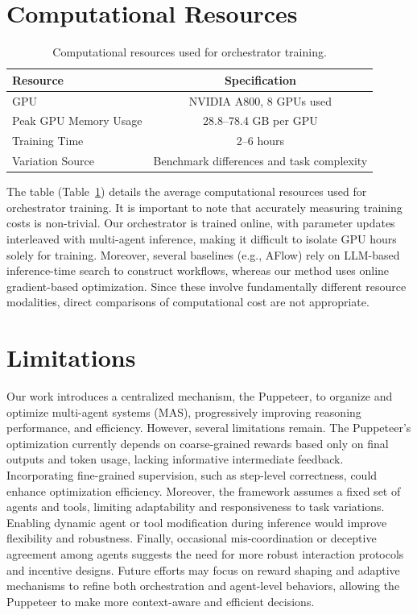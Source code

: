 \documentclass{article}
\begin{document}
\section{Computational Resources}
\begin{table}[h]
\centering
\begin{tabular}{l c }
\toprule
\textbf{Resource} & \textbf{Specification}  \\
\midrule
GPU & NVIDIA A800, 8 GPUs used \\
Peak GPU Memory Usage & 28.8--78.4 GB per GPU  \\
Training Time & 2--6 hours  \\
Variation Source & Benchmark differences and task complexity  \\
\bottomrule
\end{tabular}
\caption{Computational resources used for orchestrator training.}
\label{tab:compute}
\end{table}
The table (Table~\ref{tab:compute}) details the average computational resources used for orchestrator training. 
It is important to note that accurately measuring training costs is non-trivial. Our orchestrator is trained online, with parameter updates interleaved with multi-agent inference, making it difficult to isolate GPU hours solely for training. Moreover, several baselines (e.g., AFlow) rely on LLM-based inference-time search to construct workflows, whereas our method uses online gradient-based optimization. Since these involve fundamentally different resource modalities, direct comparisons of computational cost are not appropriate.

\section{Limitations}
\label{limitations}
Our work introduces a centralized mechanism, the Puppeteer, to organize and optimize multi-agent systems (MAS), progressively improving reasoning performance, and efficiency. However, several limitations remain. The Puppeteer’s optimization currently depends on coarse-grained rewards based only on final outputs and token usage, lacking informative intermediate feedback. Incorporating fine-grained supervision, such as step-level correctness, could enhance optimization efficiency. Moreover, the framework assumes a fixed set of agents and tools, limiting adaptability and responsiveness to task variations. Enabling dynamic agent or tool modification during inference would improve flexibility and robustness. Finally, occasional mis-coordination or deceptive agreement among agents suggests the need for more robust interaction protocols and incentive designs. Future efforts may focus on reward shaping and adaptive mechanisms to refine both orchestration and agent-level behaviors, allowing the Puppeteer to make more context-aware and efficient decisions.

\clearpage
\end{document}
